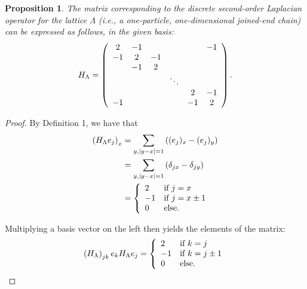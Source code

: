 \documentclass{article}
\newtheorem{proposition}{Proposition}
\newcommand{\hl}{H_\Lambda}
\numberwithin{equation}{section}
\numberwithin{theorem}{section}
\numberwithin{proposition}{section}
\numberwithin{lemma}{section}
\numberwithin{corollary}{section}
\numberwithin{definition}{section}
\begin{document}
\begin{proposition}
	The matrix corresponding to the discrete second-order Laplacian operator for the lattice $\Lambda$ (i.e., a one-particle, one-dimensional joined-end chain) can be expressed as follows, in the given basis:
	\label{propham1djoined}
	\begin{equation}
	\label{ham1djoined}
	\\ \hl = \left(
		\begin{array}{cccccc}
			2 & -1 &  &  &  & -1 \\
			-1 & 2 & -1 &  &  &  \\
			 & -1 & 2 &  &  &  \\
			 &  &  & \ddots &  &  \\
			 &  &  &  & 2 & -1 \\
			-1 &  &  &  & -1 & 2 \\
		\end{array}
	\right).
	\end{equation}
\end{proposition}

\begin{proof}
By Definition 1, we have that
\begin{align*}
	\left(H_\Lambda e_j \right) _x &=  \sum \limits_{y, |y-x| = 1} \left( (e_j)_x - (e_j)_y \right) \\
		&= \sum \limits_{y, |y-x| = 1} \left( \delta_{jx} - \delta_{jy} \right) \\
		&= \left\{
			\begin{array}{ll}
				2 & \text{\text{if} } j = x \\
				-1 & \text{\text{if} } j = x \pm 1 \\
				0 & \text{\text{else.}} \\
			\end{array}
			\right.
\end{align*}

Multiplying a basis vector on the left then yields the elements of the matrix:
\begin{equation}
	\left(H_\Lambda \right) _{jk} e_k H_\Lambda e_j = \left\{
		\begin{array}{ll}
			2 & \text{\text{if} } k = j \\
			-1 & \text{\text{if} } k = j \pm 1 \\
			0 & \text{\text{else.}} \\
		\end{array}
		\right.
\end{equation}
\end{proof}
\end{document}
